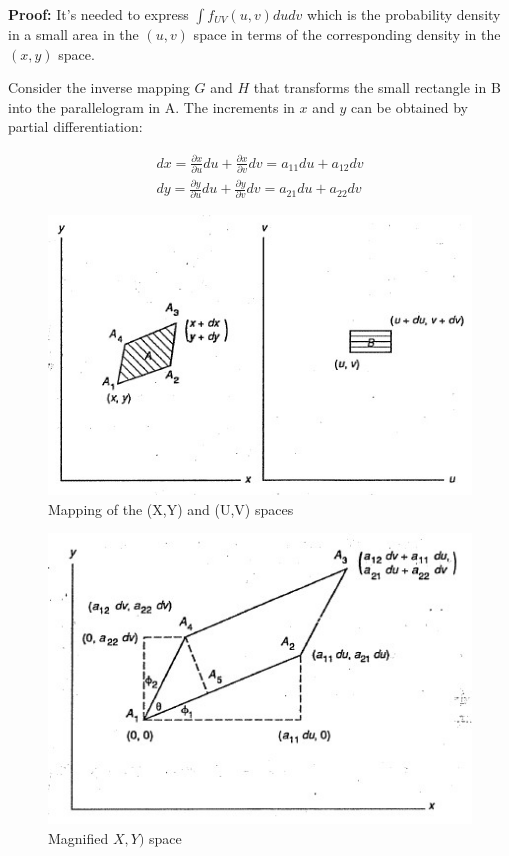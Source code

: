 \documentclass{article}
\begin{document}
\textbf{Proof:} It's needed to express \(\int f_{UV}(u,v) dudv\) which is the probability density in a small area in the \((u,v)\) space in terms of the corresponding density in the \((x,y)\) space.

Consider the inverse mapping \(G\) and \(H\) that transforms the small rectangle in B into the parallelogram in A. The increments in \(x\) and \(y\) can be obtained by partial differentiation:

\begin{equation*}
\begin{split}
    dx=\frac{\partial x}{\partial u
    }du+\frac{\partial x}{\partial v} dv= a_{11}du+a_{12}dv\\
     dy=\frac{\partial y}{\partial u
    }du+\frac{\partial y}{\partial v} dv= a_{21}du+a_{22}dv
\end{split}
\end{equation*}

\begin{figure}
    \centering
    \includegraphics{pics/mapping.jpg}
    \caption{Mapping of the (X,Y) and (U,V) spaces}
    \label{fig:enter-label100}
\end{figure}

\begin{figure}
    \centering
    \includegraphics{pics/magnified.jpg}
    \caption{Magnified \(X,Y)\) space}
    \label{fig:enter-label391}
\end{figure}
\end{document}
